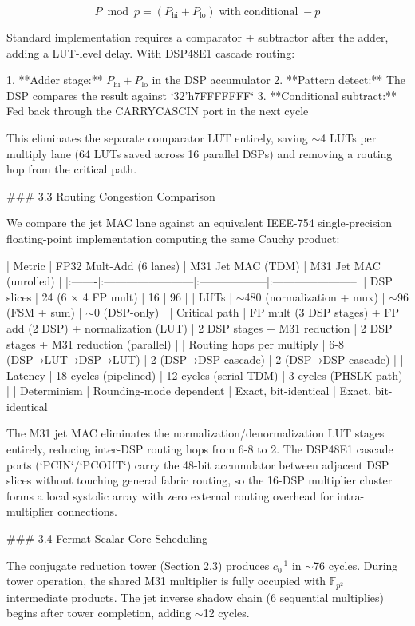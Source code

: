 $$P \bmod p = (P_{\text{hi}} + P_{\text{lo}}) \;\text{with}\; \text{conditional}\; -p$$

Standard implementation requires a comparator + subtractor after the adder, adding
a LUT-level delay. With DSP48E1 cascade routing:

1. **Adder stage:** $P_{\text{hi}} + P_{\text{lo}}$ in the DSP accumulator
2. **Pattern detect:** The DSP compares the result against `32'h7FFFFFFF`
3. **Conditional subtract:** Fed back through the CARRYCASCIN port in the next cycle

This eliminates the separate comparator LUT entirely, saving $\sim$4 LUTs per
multiply lane (64 LUTs saved across 16 parallel DSPs) and removing a routing
hop from the critical path.

### 3.3 Routing Congestion Comparison

We compare the jet MAC lane against an equivalent IEEE-754 single-precision
floating-point implementation computing the same Cauchy product:

| Metric | FP32 Mult-Add (6 lanes) | M31 Jet MAC (TDM) | M31 Jet MAC (unrolled) |
|:-------|:------------------------|:------------------|:-----------------------|
| DSP slices | 24 (6 $\times$ 4 FP mult) | 16 | 96 |
| LUTs | $\sim$480 (normalization + mux) | $\sim$96 (FSM + sum) | $\sim$0 (DSP-only) |
| Critical path | FP mult (3 DSP stages) + FP add (2 DSP) + normalization (LUT) | 2 DSP stages + M31 reduction | 2 DSP stages + M31 reduction (parallel) |
| Routing hops per multiply | 6-8 (DSP→LUT→DSP→LUT) | 2 (DSP→DSP cascade) | 2 (DSP→DSP cascade) |
| Latency | 18 cycles (pipelined) | 12 cycles (serial TDM) | 3 cycles (PHSLK path) |
| Determinism | Rounding-mode dependent | Exact, bit-identical | Exact, bit-identical |

The M31 jet MAC eliminates the normalization/denormalization LUT stages entirely,
reducing inter-DSP routing hops from 6-8 to 2. The DSP48E1 cascade ports
(`PCIN`/`PCOUT`) carry the 48-bit accumulator between adjacent DSP slices without
touching general fabric routing, so the 16-DSP multiplier cluster forms a local
systolic array with zero external routing overhead for intra-multiplier
connections.

### 3.4 Fermat Scalar Core Scheduling

The conjugate reduction tower (Section 2.3) produces $c_0^{-1}$ in $\sim$76 cycles.
During tower operation, the shared M31 multiplier is fully occupied with
$\mathbb{F}_{p^2}$ intermediate products. The jet inverse shadow chain (6
sequential multiplies) begins after tower completion, adding $\sim$12 cycles.

